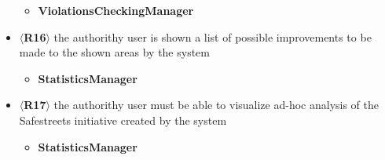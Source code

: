 \begin{itemize}
    \begin{itemize}
        \item \textbf{ViolationsCheckingManager}
    \end{itemize}  
    \item $\langle$\textbf{R16}$\rangle$ the authorithy user is shown a list of
    possible improvements to be made to the shown areas by the system
    \begin{itemize}
        \item \textbf{StatisticsManager}
    \end{itemize}  
    \item $\langle$\textbf{R17}$\rangle$ the authorithy user must be able to
    visualize ad-hoc analysis of the Safestreets initiative created by the
    system
    \begin{itemize}
        \item \textbf{StatisticsManager}
    \end{itemize}  
\end{itemize}    
